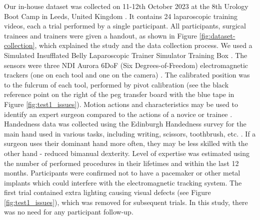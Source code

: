 Our in-house dataset was collected on 11-12th October 2023 at the 8th Urology Boot Camp in Leeds, United Kingdom \cite{urology2023}. It contains 24 laparoscopic training videos, each a trial performed by a single participant. All participants, surgical trainees and trainers were given a handout, as shown in Figure \ref{fig:dataset-collection}, which explained the study and the data collection process. We used a Simulated Insufflated Belly Laparoscopic Trainer Simulator Training Box \cite{aliexpress}. The sensors were three NDI Aurora 6DoF (Six Degrees-of-Freedom) electromagnetic trackers (one on each tool and one on the camera) \cite{hummel_design_2005}. The calibrated position was to the fulcrum of each tool, performed by pivot calibration (see the black reference point on the right of the peg transfer board with the blue tape in Figure \ref{fig:test1_issues}). Motion actions and characteristics may be used to identify an expert surgeon compared to the actions of a novice or trainee \cite{jones_analysis_2018}. Handedness data was collected using the Edinburgh Handedness survey for the main hand used in various tasks, including writing, scissors, toothbrush, etc. \cite{oldfield_assessment_1971}. If a surgeon uses their dominant hand more often, they may be less skilled with the other hand - reduced bimanual dexterity. Level of expertise was estimated using the number of performed procedures in their lifetimes and within the last 12 months. Participants were confirmed not to have a pacemaker or other metal implants which could interfere with the electromagnetic tracking system. The first trial contained extra lighting causing visual defects (see Figure \ref{fig:test1_issues}), which was removed for subsequent trials. In this study, there was no need for any participant follow-up.



